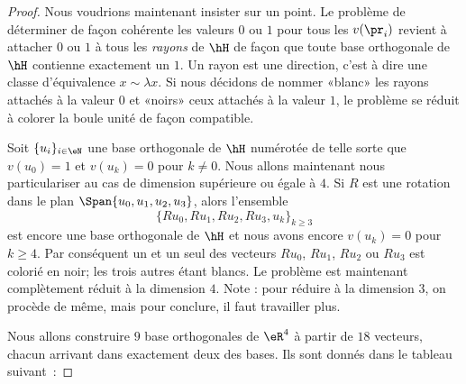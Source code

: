 \begin{proof}
    Nous voudrions maintenant insister sur un point. Le problème de déterminer de façon cohérente les valeurs \( 0\) ou \( 1\) pour tous les \( v(\pr_i)\) revient à attacher \( 0\) ou \( 1\) à tous les \emph{rayons} de \( \hH\) de façon que toute base orthogonale de \( \hH\) contienne exactement un \( 1\). Un rayon est une direction, c'est à dire une classe d'équivalence \( x\sim \lambda x\). Si nous décidons de nommer «blanc»  les rayons attachés à la valeur \( 0\) et «noirs»  ceux attachés à la valeur \( 1\), le problème se réduit à colorer la boule unité de façon compatible.

    Soit \( \{ u_i \}_{i\in \eN}\) une base orthogonale de \( \hH\) numérotée de telle sorte que \( v(u_0)=1\) et \( v(u_k)=0\) pour \( k\neq 0\). Nous allons maintenant nous particulariser au cas de dimension supérieure ou égale à \( 4\). Si \( R\) est une rotation dans le plan \( \Span\{ u_0,u_1,u_2,u_3 \}\), alors l'ensemble
    \begin{equation}
        \{ Ru_0,Ru_1,Ru_2,Ru_3,u_k \}_{k\geq 3}
    \end{equation}
    est encore une base orthogonale de \( \hH\) et nous avons encore \( v(u_k)=0\) pour \( k\geq 4\). Par conséquent un et un seul des vecteurs \( Ru_0\), \( Ru_1\), \( Ru_2\) ou \( Ru_3\) est colorié en noir; les trois autres étant blancs. Le problème est maintenant complètement réduit à la dimension \( 4\). Note : pour réduire à la dimension \( 3\), on procède de même, mais pour conclure, il faut travailler plus.

    Nous allons construire \( 9\) base orthogonales de \( \eR^4\) à partir de \( 18\) vecteurs, chacun arrivant dans exactement deux des bases. Ils sont donnés dans le tableau suivant\ :



\end{proof}
